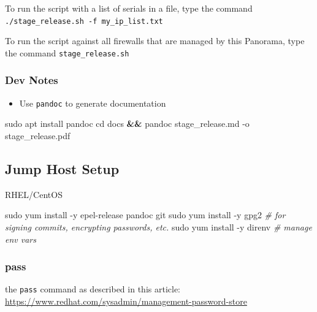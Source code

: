 \documentclass[
]{article}
\newenvironment{Shaded}{}{}
\newcommand{\BuiltInTok}[1]{#1}
\newcommand{\CommentTok}[1]{\textcolor[rgb]{0.38,0.63,0.69}{\textit{#1}}}
\newcommand{\ExtensionTok}[1]{#1}
\newcommand{\FunctionTok}[1]{\textcolor[rgb]{0.02,0.16,0.49}{#1}}
\newcommand{\KeywordTok}[1]{\textcolor[rgb]{0.00,0.44,0.13}{\textbf{#1}}}
\newcommand{\NormalTok}[1]{#1}
\providecommand{\tightlist}{%
  \setlength{\itemsep}{0pt}\setlength{\parskip}{0pt}}
\begin{document}
To run the script with a list of serials in a file, type the command
\texttt{./stage\_release.sh\ -f\ my\_ip\_list.txt}

To run the script against all firewalls that are managed by this
Panorama, type the command \texttt{stage\_release.sh}

\hypertarget{dev-notes}{%
\subsubsection{Dev Notes}\label{dev-notes}}

\begin{itemize}
\tightlist
\item
  Use \texttt{pandoc} to generate documentation
\end{itemize}

\begin{Shaded}
\begin{Highlighting}[]
\FunctionTok{sudo}\NormalTok{ apt install pandoc}
\BuiltInTok{cd}\NormalTok{ docs }\KeywordTok{\&\&} \ExtensionTok{pandoc}\NormalTok{ stage\_release.md {-}o stage\_release.pdf}
\end{Highlighting}
\end{Shaded}

\hypertarget{jump-host-setup}{%
\subsection{Jump Host Setup}\label{jump-host-setup}}

RHEL/CentOS

\begin{Shaded}
\begin{Highlighting}[]
\FunctionTok{sudo}\NormalTok{ yum install {-}y epel{-}release pandoc git}
\FunctionTok{sudo}\NormalTok{ yum install {-}y gpg2 }\CommentTok{\# for signing commits, encrypting passwords, etc.}
\FunctionTok{sudo}\NormalTok{ yum install {-}y direnv }\CommentTok{\# manage env vars}
\end{Highlighting}
\end{Shaded}

\hypertarget{pass}{%
\subsubsection{pass}\label{pass}}

the \texttt{pass} command as described in this article:
\url{https://www.redhat.com/sysadmin/management-password-store}
\end{document}
